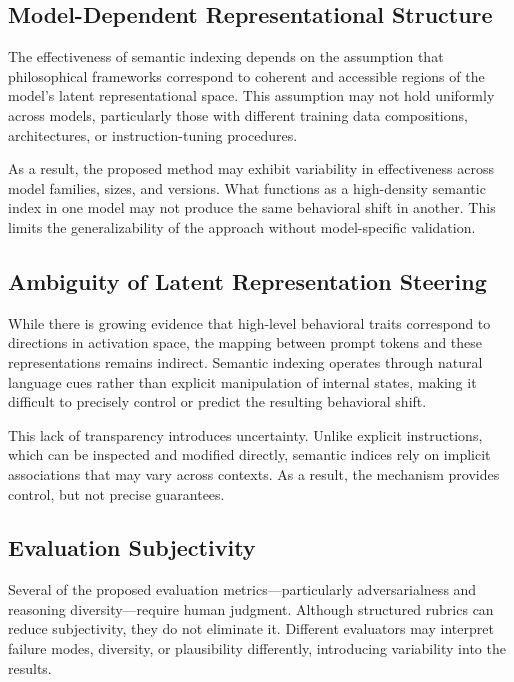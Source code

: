 \documentclass[11pt]{article}
\begin{document}
\subsection{Model-Dependent Representational Structure}

The effectiveness of semantic indexing depends on the assumption that philosophical frameworks correspond to coherent and accessible regions of the model’s latent representational space. This assumption may not hold uniformly across models, particularly those with different training data compositions, architectures, or instruction-tuning procedures.

As a result, the proposed method may exhibit variability in effectiveness across model families, sizes, and versions. What functions as a high-density semantic index in one model may not produce the same behavioral shift in another. This limits the generalizability of the approach without model-specific validation.

\subsection{Ambiguity of Latent Representation Steering}

While there is growing evidence that high-level behavioral traits correspond to directions in activation space, the mapping between prompt tokens and these representations remains indirect. Semantic indexing operates through natural language cues rather than explicit manipulation of internal states, making it difficult to precisely control or predict the resulting behavioral shift.

This lack of transparency introduces uncertainty. Unlike explicit instructions, which can be inspected and modified directly, semantic indices rely on implicit associations that may vary across contexts. As a result, the mechanism provides control, but not precise guarantees.

\subsection{Evaluation Subjectivity}

Several of the proposed evaluation metrics—particularly adversarialness and reasoning diversity—require human judgment. Although structured rubrics can reduce subjectivity, they do not eliminate it. Different evaluators may interpret failure modes, diversity, or plausibility differently, introducing variability into the results.
\end{document}
